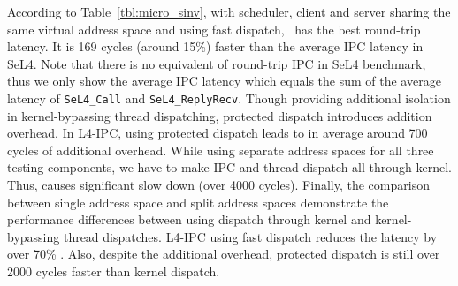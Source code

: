 

According to Table~\ref{tbl:micro_sinv}, with scheduler, client and server sharing the same virtual address space and using fast dispatch, \name\ has the best round-trip latency.
It is 169 cycles (around 15\%) faster than the average IPC latency in SeL4.
Note that there is no equivalent of round-trip IPC in SeL4 benchmark, thus we only show the average IPC latency which equals the sum of the average latency of {\tt SeL4\_Call} and {\tt SeL4\_ReplyRecv}.
Though providing additional isolation in kernel-bypassing thread dispatching, protected dispatch introduces addition overhead.
In L4-IPC, using protected dispatch leads to in average around 700 cycles of additional overhead.
While using separate address spaces for all three testing components, we have to make IPC and thread dispatch all through kernel.
Thus, causes significant slow down (over 4000 cycles).
Finally, the comparison between single address space and split address spaces demonstrate the performance differences between using dispatch through kernel and kernel-bypassing thread dispatches.
L4-IPC using fast dispatch reduces the latency by over 70\% .
Also, despite the additional overhead, protected dispatch is still over 2000 cycles faster than kernel dispatch.

